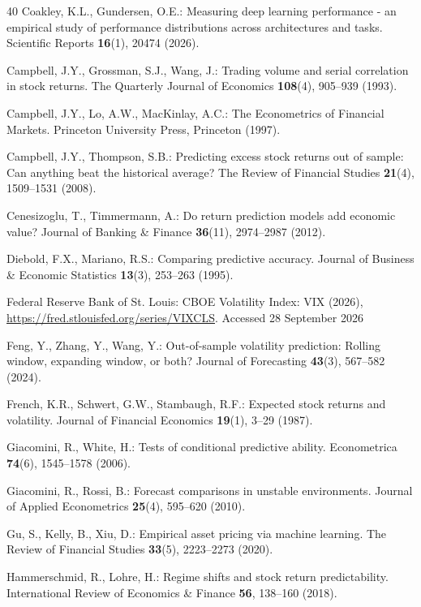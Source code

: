 \documentclass[runningheads,orivec]{llncs}
\begin{document}
\begin{thebibliography}{40}
Coakley, K.L., Gundersen, O.E.: Measuring deep learning performance - an empirical study of performance distributions across architectures and tasks. Scientific Reports \textbf{16}(1), 20474 (2026).

Campbell, J.Y., Grossman, S.J., Wang, J.: Trading volume and serial correlation in stock returns. The Quarterly Journal of Economics \textbf{108}(4), 905--939 (1993).

Campbell, J.Y., Lo, A.W., MacKinlay, A.C.: The Econometrics of Financial Markets. Princeton University Press, Princeton (1997).

Campbell, J.Y., Thompson, S.B.: Predicting excess stock returns out of sample: Can anything beat the historical average? The Review of Financial Studies \textbf{21}(4), 1509--1531 (2008).

Cenesizoglu, T., Timmermann, A.: Do return prediction models add economic value? Journal of Banking \& Finance \textbf{36}(11), 2974--2987 (2012).

Diebold, F.X., Mariano, R.S.: Comparing predictive accuracy. Journal of Business \& Economic Statistics \textbf{13}(3), 253--263 (1995).

Federal Reserve Bank of St. Louis: CBOE Volatility Index: VIX (2026), \url{https://fred.stlouisfed.org/series/VIXCLS}. Accessed 28 September 2026

Feng, Y., Zhang, Y., Wang, Y.: Out-of-sample volatility prediction: Rolling window, expanding window, or both? Journal of Forecasting \textbf{43}(3), 567--582 (2024).

French, K.R., Schwert, G.W., Stambaugh, R.F.: Expected stock returns and volatility. Journal of Financial Economics \textbf{19}(1), 3--29 (1987).

Giacomini, R., White, H.: Tests of conditional predictive ability. Econometrica \textbf{74}(6), 1545--1578 (2006).

Giacomini, R., Rossi, B.: Forecast comparisons in unstable environments. Journal of Applied Econometrics \textbf{25}(4), 595--620 (2010).

Gu, S., Kelly, B., Xiu, D.: Empirical asset pricing via machine learning. The Review of Financial Studies \textbf{33}(5), 2223--2273 (2020).

Hammerschmid, R., Lohre, H.: Regime shifts and stock return predictability. International Review of Economics \& Finance \textbf{56}, 138--160 (2018).


\end{thebibliography}
\end{document}
